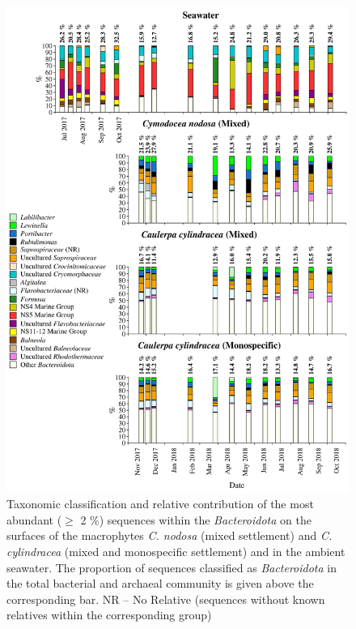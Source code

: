 \documentclass[12pt,]{article}
\begin{document}
\begin{figure}[H]

{\centering \includegraphics[width=0.85\linewidth]{../results/figures/bacteroidota_bar_plot} 

}

\caption{Taxonomic classification and relative contribution of the most abundant ($\geq$ 2 \si{\percent}) sequences within the \textit{Bacteroidota} on the surfaces of the macrophytes \textit{C. nodosa} (mixed settlement) and \textit{C. cylindracea} (mixed and monospecific settlement) and in the ambient seawater. The proportion of sequences classified as \textit{Bacteroidota} in the total bacterial and archaeal community is given above the corresponding bar. NR -- No Relative (sequences without known relatives within the corresponding group)\label{bactero}}\label{fig:unnamed-chunk-6}
\end{figure}
\end{document}
